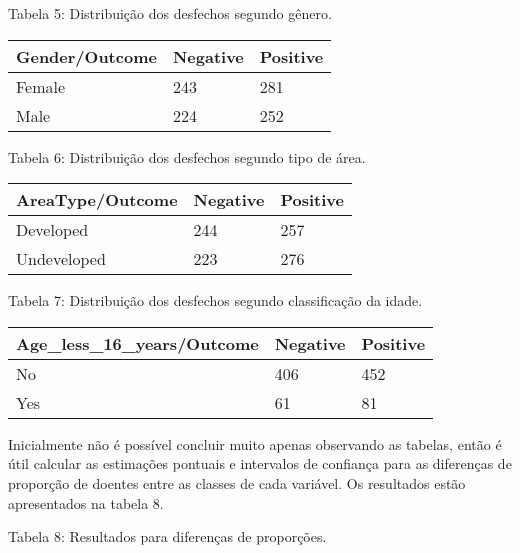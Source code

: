 \documentclass[
]{article}
\begin{document}
Tabela 5: Distribuição dos desfechos segundo gênero.

\begin{longtable}[]{@{}lll@{}}
\toprule\noalign{}
Gender/Outcome & Negative & Positive \\
\midrule\noalign{}
\endhead
\bottomrule\noalign{}
\endlastfoot
Female & 243 & 281 \\
Male & 224 & 252 \\
\end{longtable}

Tabela 6: Distribuição dos desfechos segundo tipo de área.

\begin{longtable}[]{@{}lll@{}}
\toprule\noalign{}
AreaType/Outcome & Negative & Positive \\
\midrule\noalign{}
\endhead
\bottomrule\noalign{}
\endlastfoot
Developed & 244 & 257 \\
Undeveloped & 223 & 276 \\
\end{longtable}

Tabela 7: Distribuição dos desfechos segundo classificação da idade.

\begin{longtable}[]{@{}lll@{}}
\toprule\noalign{}
Age\_less\_16\_years/Outcome & Negative & Positive \\
\midrule\noalign{}
\endhead
\bottomrule\noalign{}
\endlastfoot
No & 406 & 452 \\
Yes & 61 & 81 \\
\end{longtable}

Inicialmente não é possível concluir muito apenas observando as tabelas,
então é útil calcular as estimações pontuais e intervalos de confiança
para as diferenças de proporção de doentes entre as classes de cada
variável. Os resultados estão apresentados na tabela 8.

Tabela 8: Resultados para diferenças de proporções.
\end{document}

